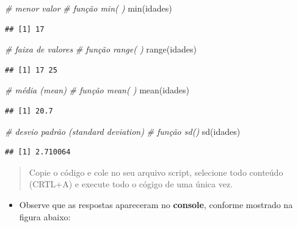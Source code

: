 \documentclass[
]{book}
\newenvironment{Shaded}{\begin{snugshade}}{\end{snugshade}}
\newcommand{\CommentTok}[1]{\textcolor[rgb]{0.56,0.35,0.01}{\textit{#1}}}
\newcommand{\FunctionTok}[1]{\textcolor[rgb]{0.00,0.00,0.00}{#1}}
\newcommand{\NormalTok}[1]{#1}
\providecommand{\tightlist}{%
  \setlength{\itemsep}{0pt}\setlength{\parskip}{0pt}}
\begin{document}
\begin{Shaded}
\begin{Highlighting}[]
\CommentTok{\# menor valor}
\CommentTok{\# função min( )}
\FunctionTok{min}\NormalTok{(idades)}
\end{Highlighting}
\end{Shaded}

\begin{verbatim}
## [1] 17
\end{verbatim}

\begin{Shaded}
\begin{Highlighting}[]
\CommentTok{\# faixa de valores}
\CommentTok{\# função range( )}
\FunctionTok{range}\NormalTok{(idades)}
\end{Highlighting}
\end{Shaded}

\begin{verbatim}
## [1] 17 25
\end{verbatim}

\begin{Shaded}
\begin{Highlighting}[]
\CommentTok{\# média (mean)}
\CommentTok{\# função mean( )}
\FunctionTok{mean}\NormalTok{(idades)}
\end{Highlighting}
\end{Shaded}

\begin{verbatim}
## [1] 20.7
\end{verbatim}

\begin{Shaded}
\begin{Highlighting}[]
\CommentTok{\# desvio padrão (standard deviation)}
\CommentTok{\# função sd() }
\FunctionTok{sd}\NormalTok{(idades)}
\end{Highlighting}
\end{Shaded}

\begin{verbatim}
## [1] 2.710064
\end{verbatim}

\begin{quote}
Copie o código e cole no seu arquivo script, selecione todo conteúdo (CRTL+A) e execute todo o cógigo de uma única vez.
\end{quote}

\begin{itemize}
\tightlist
\item
  Observe que as respostas apareceram no \textbf{console}, conforme mostrado na figura abaixo:
\end{itemize}
\end{document}
